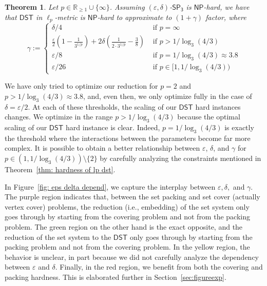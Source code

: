 \documentclass{article}\providecommand{\DeclareRedundantLanguages}[2]{}\usepackage[a4paper,margin=20mm]{geometry}
\newtheorem{theorem}{Theorem}\newtheorem{lemma}[theorem]{Lemma}\newtheorem{proposition}[theorem]{Proposition}\newtheorem{corollary}[theorem]{Corollary}\newtheorem{definition}[theorem]{Definition}\newtheorem{claim}[theorem]{Claim}\newtheorem{remark}[theorem]{Remark}\newtheorem{observation}[theorem]{Observation}\newtheorem{conjecture}[theorem]{Conjecture}\newtheorem{example}[theorem]{Example}
\newcommand{\1}{\textbf{1}}
\newcommand{\setpT}{$\mathsf{SP_3}$\xspace}
\newcommand{\dst}{$\mathsf{DST}$\xspace}
\newcommand{\np}{$\mathsf{NP}$\xspace}
\begin{document}
\begin{theorem}\label{thm:intromain}
    Let $p\in \mathbb{R}_{\geq 1}\cup\{\infty\}$. Assuming $(\varepsilon,\delta)$-\setpT is \np-hard, we have that \dst in $\ell_p$-metric is \np-hard to approximate to $(1+\gamma)$ factor, where
    $$\gamma:=\begin{cases}
        \delta/4&\text{ if } p=\infty \\
        \frac{\varepsilon}{2}\left(1-\frac{1}{3^{1/p}}\right)+2\delta\left(\frac{1}{2\cdot 3^{1/p}}-\frac{3}{8}\right)&\text{ if }p>1/\log_3 (4/3) \\
        \varepsilon/8&\text{ if } p=1/\log_3 (4/3) \approx 3.8\\ 
 \varepsilon/26 &\text{ if } p  \in [1,  1/\log_3(4/3))
     \end{cases}$$
\end{theorem}

We have only tried to optimize our reduction for $p=2$ and $p>1/\log_3(4/3)\approx 3.8$, and, even then, we only optimize fully in the case of $\delta = \varepsilon/2$. At each of these thresholds, the scaling of our \dst hard instances changes. We optimize in the range $p>1/\log_3(4/3)$ because the optimal scaling of our \dst hard instance is clear. Indeed, $p = 1/\log_3(4/3)$ is exactly the threshold where the interactions between the parameters become far more complex. It is possible to obtain a better relationship between $\varepsilon$, $\delta$, and $\gamma$ for $p\in (1,1/\log_3(4/3))\setminus \{2\}$ by carefully analyzing the constraints mentioned in Theorem~\ref{thm: hardness of lp dst}. 

In Figure~\ref{fig: eps delta depend}, we capture the interplay between $\varepsilon,\delta,$ and $\gamma$. The purple region indicates that, between the set packing and set cover (actually vertex cover) problems, the reduction (i.e., embedding) of the set system only goes through by starting from the covering problem and not from the packing problem. The green region on the other hand is the exact opposite, and the reduction  of the set system to the \dst only goes through by starting from the packing problem and not from the covering problem. In the yellow region, the behavior is unclear, in part because we did not carefully analyze the dependency between $\varepsilon$ and $\delta$. Finally, in the red region, we benefit from both the covering and packing hardness. This is elaborated further in Section~\ref{sec:figureexp}. 
\end{document}
